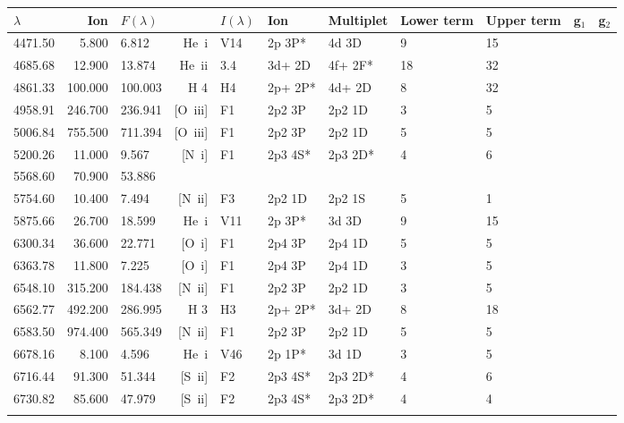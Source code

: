  \begin{longtable}{lrlrlllllll}
 \hline
 $ \lambda $ & Ion & $F \left( \lambda \right) $ && $I \left( \lambda \right) $ & Ion & Multiplet & Lower term & Upper term & g$_1$ & g$_2$ \\
 \hline
 4471.50 &   5.800 &   6.812 &  He~{\sc i}      &  V14       &  2p 3P*    &  4d 3D     &          9 &       15    \\
 4685.68 &  12.900 &  13.874 &  He~{\sc ii}     &  3.4       &  3d+ 2D    &  4f+ 2F*   &         18 &       32    \\
 4861.33 & 100.000 & 100.003 &  H 4       &  H4        &  2p+ 2P*   &  4d+ 2D    &          8 &       32          \\
 4958.91 & 246.700 & 236.941 &  [O~{\sc iii}]   &  F1        &  2p2 3P    &  2p2 1D    &          3 &        5    \\
 5006.84 & 755.500 & 711.394 &  [O~{\sc iii}]   &  F1        &  2p2 3P    &  2p2 1D    &          5 &        5    \\
 5200.26 &  11.000 &   9.567 &  [N~{\sc i}]     &  F1        &  2p3 4S*   &  2p3 2D*   &          4 &        6    \\
 5568.60 &  70.900 &  53.886                                                                                      \\
 5754.60 &  10.400 &   7.494 &  [N~{\sc ii}]    &  F3        &  2p2 1D    &  2p2 1S    &          5 &        1    \\
 5875.66 &  26.700 &  18.599 &  He~{\sc i}      &  V11       &  2p 3P*    &  3d 3D     &          9 &       15    \\
 6300.34 &  36.600 &  22.771 &  [O~{\sc i}]     &  F1        &  2p4 3P    &  2p4 1D    &          5 &        5    \\
 6363.78 &  11.800 &   7.225 &  [O~{\sc i}]     &  F1        &  2p4 3P    &  2p4 1D    &          3 &        5    \\
 6548.10 & 315.200 & 184.438 &  [N~{\sc ii}]    &  F1        &  2p2 3P    &  2p2 1D    &          3 &        5    \\
 6562.77 & 492.200 & 286.995 &  H 3       &  H3        &  2p+ 2P*   &  3d+ 2D    &          8 &       18          \\
 6583.50 & 974.400 & 565.349 &  [N~{\sc ii}]    &  F1        &  2p2 3P    &  2p2 1D    &          5 &        5    \\
 6678.16 &   8.100 &   4.596 &  He~{\sc i}      &  V46       &  2p 1P*    &  3d 1D     &          3 &        5    \\
 6716.44 &  91.300 &  51.344 &  [S~{\sc ii}]    &  F2        &  2p3 4S*   &  2p3 2D*   &          4 &        6    \\
 6730.82 &  85.600 &  47.979 &  [S~{\sc ii}]    &  F2        &  2p3 4S*   &  2p3 2D*   &          4 &        4    \\
 \hline
 \label{tab:mz1/mz1-total-fluxes.dat_linelist}
 \end{longtable}
